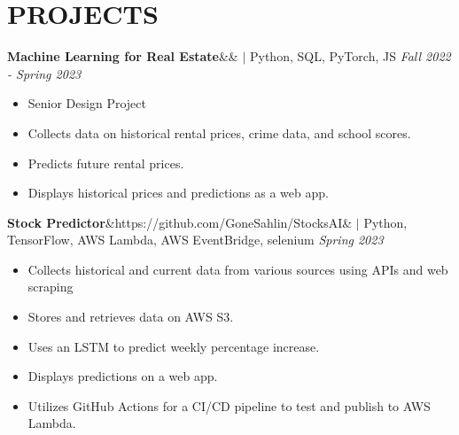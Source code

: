 \documentclass[11pt, a4paper, roman]{moderncv}
\newcommand{\project}[5]{
	\textbf{#1}\ifx&#2&{}
	\else
    		\href{#2}{\:\small\faGithub\:}\fi$|$ #3
	\hfill\textit{#4}
	#5
	\vspace{2mm}
}
\begin{document}
\vspace*{-2mm}
\section{PROJECTS}

{\project{Machine Learning for Real Estate}{}{Python, SQL, PyTorch, JS}{Fall 2022 - Spring 2023}
	{\begin{itemize}
		\item Senior Design Project
		\item Collects data on historical rental prices, crime data, and school scores.
		\item Predicts future rental prices.
		\item Displays historical prices and predictions as a web app.
	\end{itemize}}
}

{\project{Stock Predictor}{https://github.com/GoneSahlin/StocksAI}{Python, TensorFlow, AWS Lambda, AWS EventBridge, selenium}{Spring 2023}
	{\begin{itemize}
		\item Collects historical and current data from various sources using APIs and web scraping
		\item Stores and retrieves data on AWS S3.
		\item Uses an LSTM to predict weekly percentage increase.
		\item Displays predictions on a web app.
		\item Utilizes GitHub Actions for a CI/CD pipeline to test and publish to AWS Lambda.
	\end{itemize}}
}		


\end{document}

